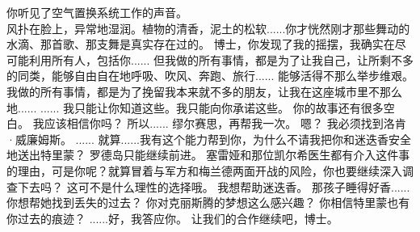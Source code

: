 \documentclass[openany]{book}
\begin{document}
\begin{dialogue}
    你听见了空气置换系统工作的声音。\\
    风扑在脸上，异常地湿润。植物的清香，泥土的松软......你才恍然刚才那些舞动的水滴、那首歌、那支舞是真实存在过的。
     博士，你发现了我的摇摆，我确实在尽可能利用所有人，包括你......
     但我做的所有事情，都是为了让我自己，让所剩不多的同类，能够自由自在地呼吸、吹风、奔跑、旅行......
     能够活得不那么举步维艰。
     我做的所有事情，都是为了挽留我本来就不多的朋友，让我在这座城市里不那么地......
     ......
     我只能让你知道这些。我只能向你承诺这些。
     你的故事还有很多空白。
     我应该相信你吗？
     所以......
     缪尔赛思，再帮我一次。
     嗯？
     我必须找到洛肯·威廉姆斯。
     ......
     就算......我有这个能力帮到你，为什么不请我把你和迷迭香安全地送出特里蒙？
     罗德岛只能继续前进。
     塞雷娅和那位凯尔希医生都有介入这件事的理由，可是你呢？就算冒着与军方和梅兰德两面开战的风险，你也要继续深入调查下去吗？
     这可不是什么理性的选择哦。
     我想帮助迷迭香。
     那孩子睡得好香......
     你想帮她找到丢失的过去？
     你对克丽斯腾的梦想这么感兴趣？
     你相信特里蒙也有你过去的痕迹？
     ......好，我答应你。
     让我们的合作继续吧，博士。
\end{dialogue}
\end{document}
